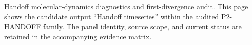 Handoff molecular-dynamics diagnostics and first-divergence audit. This page shows the candidate output ``Handoff timeseries'' within the audited P2-HANDOFF family. The panel identity, source scope, and current status are retained in the accompanying evidence matrix.
